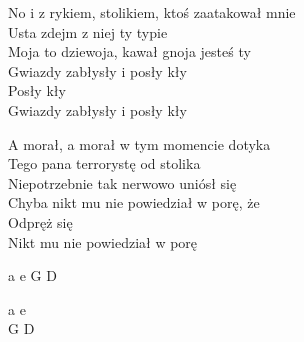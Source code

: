 \documentclass[a5paper, 10pt]{book}
\begin{document}
\begin{minipage}[t]{0.8\textwidth}
No i z rykiem, stolikiem, ktoś zaatakował mnie\\
Usta zdejm z niej ty typie\\
Moja to dziewoja, kawał gnoja jesteś ty\\
Gwiazdy zabłysły i posły kły\\
\hspace*{5mm}Posły kły\\
\hspace*{5mm}Gwiazdy zabłysły i posły kły\vspace*{2mm}

A morał, a morał w tym momencie dotyka\\
Tego pana terrorystę od stolika\\
Niepotrzebnie tak nerwowo uniósł się\\
Chyba nikt mu nie powiedział w porę, że\\
\hspace*{5mm}Odpręż się\\
\hspace*{5mm}Nikt mu nie powiedział w porę
\end{minipage}
\begin{minipage}[t]{0.2\textwidth}
a e G D\vspace*{2mm}

a e\\
G D\\
\end{minipage}

\newpage
\end{document}
